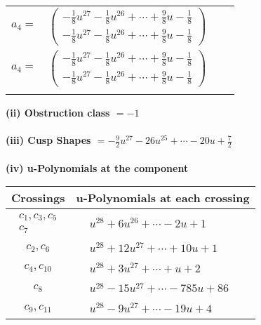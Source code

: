 \documentclass[1p]{elsarticle_modified}
\theoremstyle{definition}
\begin{document}
\begin{tabular}{m{7pt} m{180pt} m{7pt} m{180pt} }
\flushright $a_{4}=$&$\begin{pmatrix}-\frac{1}{8} u^{27}-\frac{1}{8} u^{26}+\cdots+\frac{9}{8} u-\frac{1}{8}\\-\frac{1}{8} u^{27}-\frac{1}{8} u^{26}+\cdots+\frac{9}{8} u-\frac{1}{8}\end{pmatrix}$\\ \flushright $a_{4}=$&$\begin{pmatrix}-\frac{1}{8} u^{27}-\frac{1}{8} u^{26}+\cdots+\frac{9}{8} u-\frac{1}{8}\\-\frac{1}{8} u^{27}-\frac{1}{8} u^{26}+\cdots+\frac{9}{8} u-\frac{1}{8}\end{pmatrix}$\\&\end{tabular}
\flushleft \textbf{(ii) Obstruction class $= -1$}\\~\\
\flushleft \textbf{(iii) Cusp Shapes $= -\frac{9}{2} u^{27}-26 u^{25}+\cdots-20 u+\frac{7}{2}$}\\~\\
\newpage\renewcommand{\arraystretch}{1}
\flushleft \textbf{(iv) u-Polynomials at the component}\newline \\
\begin{tabular}{m{50pt}|m{274pt}}
Crossings & \hspace{64pt}u-Polynomials at each crossing \\
\hline $$\begin{aligned}c_{1},c_{3},c_{5}\\c_{7}\end{aligned}$$&$\begin{aligned}
&u^{28}+6 u^{26}+\cdots-2 u+1
\end{aligned}$\\
\hline $$\begin{aligned}c_{2},c_{6}\end{aligned}$$&$\begin{aligned}
&u^{28}+12 u^{27}+\cdots+10 u+1
\end{aligned}$\\
\hline $$\begin{aligned}c_{4},c_{10}\end{aligned}$$&$\begin{aligned}
&u^{28}+3 u^{27}+\cdots+u+2
\end{aligned}$\\
\hline $$\begin{aligned}c_{8}\end{aligned}$$&$\begin{aligned}
&u^{28}-15 u^{27}+\cdots-785 u+86
\end{aligned}$\\
\hline $$\begin{aligned}c_{9},c_{11}\end{aligned}$$&$\begin{aligned}
&u^{28}-9 u^{27}+\cdots-19 u+4
\end{aligned}$\\
\hline
\end{tabular}\\~\\
\end{document}
